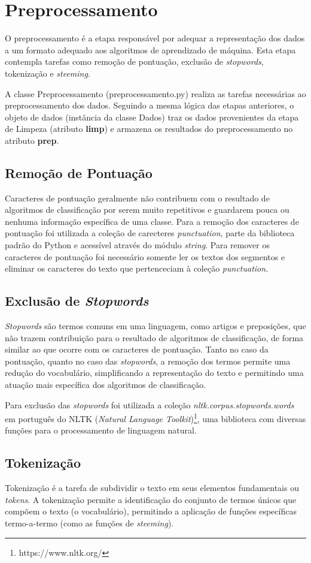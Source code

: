 \section{Preprocessamento}

O preprocessamento é a etapa responsável por adequar a representação dos dados a um formato adequado aos algoritmos de aprendizado de máquina. Esta etapa contempla tarefas como remoção de pontuação, exclusão de \textit{stopwords}, tokenização e \textit{steeming}.

A classe Preprocessamento (preprocessamento.py) realiza as tarefas necessárias ao preprocessamento dos dados. Seguindo a mesma lógica das etapas anteriores, o objeto de dados (instância da classe Dados) traz os dados provenientes da etapa de Limpeza (atributo \textbf{limp}) e armazena os resultados do preprocessamento no atributo \textbf{prep}.  

\subsection{Remoção de Pontuação}

Caracteres de pontuação geralmente não contribuem com o resultado de algoritmos de classificação por serem muito repetitivos e guardarem pouca ou nenhuma informação específica de uma classe. Para a remoção dos caracteres de pontuação foi utilizada a coleção de carecteres \textit{punctuation}, parte da biblioteca padrão do Python e acessível através do módulo \textit{string}. Para remover os caracteres de pontuação foi necessário somente ler os textos dos segmentos e eliminar os caracteres do texto que pertenceciam à coleção \textit{punctuation}.

\subsection{Exclusão de \textit{Stopwords}}

\textit{Stopwords} são termos comuns em uma linguagem, como artigos e preposições, que não trazem contribuição para o resultado de algoritmos de classificação, de forma similar ao que ocorre com os caracteres de pontuação. Tanto no caso da pontuação, quanto no caso das \textit{stopwords}, a remoção dos termos permite uma redução do vocabulário, simplificando a representação do texto e permitindo uma atuação mais específica dos algoritmos de classificação.

Para exclusão das \textit{stopwords} foi utilizada a coleção \textit{nltk.corpus.stopwords.words} em português do NLTK (\textit{Natural Language Toolkit})\footnote{https://www.nltk.org/}, uma biblioteca com diversas funções para o processamento de linguagem natural.

\subsection{Tokenização}

Tokenização é a tarefa de subdividir o texto em seus elementos fundamentais ou \textit{tokens}. A tokenização permite a identificação do conjunto de termos únicos que compõem o texto (o vocabulário), permitindo a aplicação de funções específicas termo-a-termo (como as funções de \textit{steeming}).    